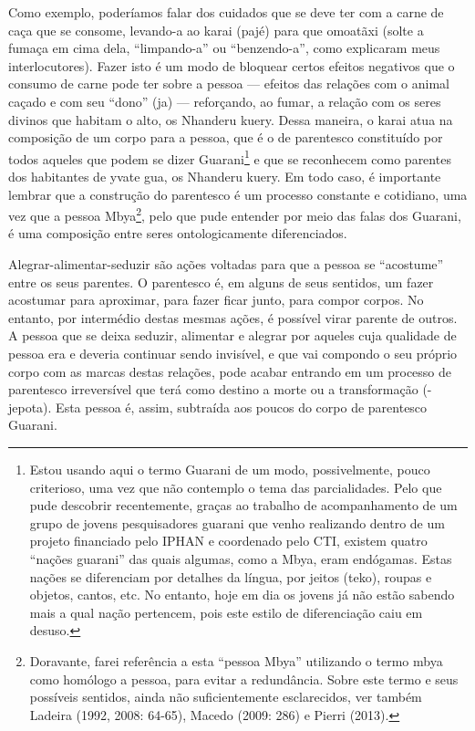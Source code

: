 \documentclass{article}
\begin{document}
Como exemplo, poder\'iamos falar dos cuidados que se deve ter com a
carne de ca\c{c}a que se consome, levando-a ao karai (paj\'e) para que
omoat\~axi (solte a fuma\c{c}a em cima dela,
{\textquotedblleft}limpando-a{\textquotedblright} ou
{\textquotedblleft}benzendo-a{\textquotedblright}, como explicaram meus
interlocutores). Fazer isto \'e um modo de bloquear certos efeitos
negativos que o consumo de carne pode ter sobre a pessoa --- efeitos
das rela\c{c}\~oes com o animal ca\c{c}ado e com seu
{\textquotedblleft}dono{\textquotedblright} (ja) --- refor\c{c}ando, ao
fumar, a rela\c{c}\~ao com os seres divinos que habitam o alto, os
Nhanderu kuery. Dessa maneira, o karai atua na composi\c{c}\~ao de um
corpo para a pessoa, que \'e o de parentesco constitu\'ido por todos
aqueles que podem se dizer Guarani\footnote{ Estou usando aqui o termo
Guarani de um modo, possivelmente, pouco criterioso, uma vez que n\~ao
contemplo o tema das parcialidades. Pelo que pude descobrir
recentemente, gra\c{c}as ao trabalho de acompanhamento de um grupo de
jovens pesquisadores guarani que venho realizando dentro de um projeto
financiado pelo IPHAN e coordenado pelo CTI, existem quatro
{\textquotedblleft}na\c{c}\~oes guarani{\textquotedblright} das quais
algumas, como a Mbya, eram end\'ogamas. Estas na\c{c}\~oes se
diferenciam por detalhes da l\'ingua, por jeitos (teko), roupas e
objetos, cantos, etc. No entanto, hoje em dia os jovens j\'a n\~ao
est\~ao sabendo mais a qual na\c{c}\~ao pertencem, pois este estilo de
diferencia\c{c}\~ao caiu em desuso.} e que se reconhecem como parentes
dos habitantes de yvate gua, os Nhanderu kuery. Em todo caso, \'e
importante lembrar que a constru\c{c}\~ao do parentesco \'e um processo
constante e cotidiano, uma vez que a pessoa Mbya\footnote{ Doravante,
farei refer\^encia a esta {\textquotedblleft}pessoa
Mbya{\textquotedblright} utilizando o termo mbya como hom\'ologo a
pessoa, para evitar a redund\^ancia. Sobre este termo e seus
poss\'iveis sentidos, ainda n\~ao suficientemente esclarecidos, ver
tamb\'em Ladeira (1992, 2008: 64-65), Macedo (2009: 286) e Pierri
(2013).  }, pelo que pude entender por meio das falas dos Guarani, \'e
uma composi\c{c}\~ao entre seres ontologicamente diferenciados.

Alegrar-alimentar-seduzir s\~ao a\c{c}\~oes voltadas para que a pessoa
se {\textquotedblleft}acostume{\textquotedblright} entre os seus
parentes. O parentesco \'e, em alguns de seus sentidos, um fazer
acostumar para aproximar, para fazer ficar junto, para compor corpos.
No entanto, por interm\'edio destas mesmas a\c{c}\~oes, \'e poss\'ivel
virar parente de outros. A pessoa que se deixa seduzir, alimentar e
alegrar por aqueles cuja qualidade de pessoa era e deveria continuar
sendo invis\'ivel, e que vai compondo o seu pr\'oprio corpo com as
marcas destas rela\c{c}\~oes, pode acabar entrando em um processo de
parentesco irrevers\'ivel que ter\'a como destino a morte ou a
transforma\c{c}\~ao (-jepota). Esta pessoa \'e, assim, subtra\'ida aos
poucos do corpo de parentesco Guarani.
\end{document}
